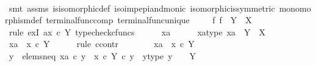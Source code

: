 \begin{isabellebody}
\ \ \ \ \isamarkupfalse%
\ {\isacharparenleft}{\kern0pt}smt\ assms\ is{\isacharunderscore}{\kern0pt}isomorphic{\isacharunderscore}{\kern0pt}def\ iso{\isacharunderscore}{\kern0pt}imp{\isacharunderscore}{\kern0pt}epi{\isacharunderscore}{\kern0pt}and{\isacharunderscore}{\kern0pt}monic\ isomorphic{\isacharunderscore}{\kern0pt}is{\isacharunderscore}{\kern0pt}symmetric\ monomorphism{\isacharunderscore}{\kern0pt}def{}\ terminal{\isacharunderscore}{\kern0pt}func{\isacharunderscore}{\kern0pt}comp\ terminal{\isacharunderscore}{\kern0pt}func{\isacharunderscore}{\kern0pt}unique{\isacharparenright}{\kern0pt}\isanewline
\ \ \isamarkupfalse%
\ \ {\isachardoublequoteopen}{\isasymexists}{\isacharbang}{\kern0pt}f{\isachardot}{\kern0pt}\ f\ {\isacharcolon}{\kern0pt}\ Y\ {\isasymrightarrow}\ X{\isachardoublequoteclose}\isanewline
\ \ \isamarkupfalse%
\ {\isacharparenleft}{\kern0pt}rule\ ex{}I{\isacharbrackleft}{\kern0pt}\ a{\isacharequal}{\kern0pt}{\isachardoublequoteopen}x\ {\isasymcirc}\isactrlsub c\ {\isasymbeta}\isactrlbsub Y\isactrlesub {\isachardoublequoteclose}{\isacharbrackright}{\kern0pt}{\isacharcomma}{\kern0pt}\ typecheck{\isacharunderscore}{\kern0pt}cfuncs{\isacharparenright}{\kern0pt}\isanewline
\ \ \ \ \isamarkupfalse%
\ xa\isanewline
\ \ \ \ \isamarkupfalse%
\ xa{\isacharunderscore}{\kern0pt}type{\isacharcolon}{\kern0pt}\ {\isachardoublequoteopen}xa\ {\isacharcolon}{\kern0pt}\ Y\ {\isasymrightarrow}\ X{\isachardoublequoteclose}\isanewline
\ \ \ \ \isamarkupfalse%
\ {\isachardoublequoteopen}xa\ {\isacharequal}{\kern0pt}\ x\ {\isasymcirc}\isactrlsub c\ {\isasymbeta}\isactrlbsub Y\isactrlesub {\isachardoublequoteclose}\isanewline
\ \ \ \ \isamarkupfalse%
\ {\isacharparenleft}{\kern0pt}rule\ ccontr{\isacharparenright}{\kern0pt}\isanewline
\ \ \ \ \ \ \isamarkupfalse%
\ {\isachardoublequoteopen}xa\ {\isasymnoteq}\ x\ {\isasymcirc}\isactrlsub c\ {\isasymbeta}\isactrlbsub Y\isactrlesub {\isachardoublequoteclose}\isanewline
\ \ \ \ \ \ \isamarkupfalse%
\ \isamarkupfalse%
\ y\ \ elems{\isacharunderscore}{\kern0pt}neq{\isacharcolon}{\kern0pt}\ {\isachardoublequoteopen}xa\ {\isasymcirc}\isactrlsub c\ y\ {\isasymnoteq}\ {\isacharparenleft}{\kern0pt}x\ {\isasymcirc}\isactrlsub c\ {\isasymbeta}\isactrlbsub Y\isactrlesub {\isacharparenright}{\kern0pt}\ {\isasymcirc}\isactrlsub c\ y{\isachardoublequoteclose}\ \ y{\isacharunderscore}{\kern0pt}type{\isacharcolon}{\kern0pt}\ {\isachardoublequoteopen}y\ {\isacharcolon}{\kern0pt}\ {\isasymone}\ {\isasymrightarrow}\ Y{\isachardoublequoteclose}\isanewline

\end{isabellebody}
